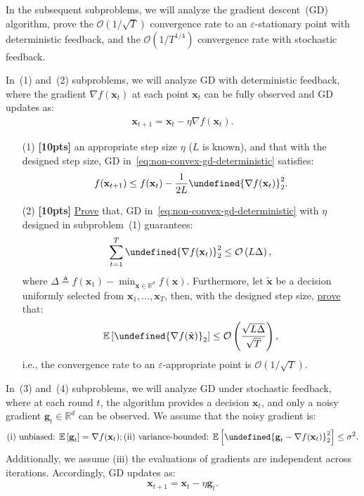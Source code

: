 \documentclass[a4paper]{article}
\numberwithin{equation}{section}
\theoremstyle{definition}
\theoremstyle{definition}
\def \E {\mathbb{E}}
\def \O {\mathcal{O}}
\def \R {\mathbb{R}}
\def \g {\textbf{g}}
\def \x {\textbf{x}}
\def \xt {\tilde{\x}}
\let\norm\undefined
\let\epsilon\varepsilon
\DeclarePairedDelimiter\norm{\lVert}{\rVert}
\begin{document}
In the subsequent subproblems, we will analyze the gradient descent~(GD) algorithm, prove the $\O(1/\sqrt{T})$ convergence rate to an $\epsilon$-stationary point with deterministic feedback, and the $\O(1/T^{1/4})$ convergence rate with stochastic feedback. 

\begin{tcolorbox}
  In~(1) and~(2) subproblems, we will analyze GD with deterministic feedback, where the gradient $\nabla f(\x_t)$ at each point $\x_t$ can be fully observed and GD updates as:
\begin{align}
  \label{eq:non-convex-gd-deterministic}
  \x_{t+1} = \x_t - \eta \nabla f(\x_t).
\end{align}
\end{tcolorbox}

\begin{enumerate}
  \item[(1)] \textbf{[10pts]}  an appropriate step size $\eta$ ($L$ is known), and  that with the designed step size, GD in~\eqref{eq:non-convex-gd-deterministic} satisfies:
  \begin{align*}
    f(\x_{t+1}) \leq f(\x_t) - \frac{1}{2L}\norm{\nabla f(\x_t)}_2^2.
  \end{align*}
  \item[(2)] \textbf{[10pts]} \underline{Prove} that, GD in~\eqref{eq:non-convex-gd-deterministic} with $\eta$ designed in subproblem~(1) guarantees:
    \begin{align*}
      \sum_{t=1}^T\norm{\nabla f(\x_t)}_2^2 \leq \O\left(L\Delta\right),
    \end{align*}
    where $\Delta \triangleq f(\x_1) - \min_{\x \in \R^d} f(\x)$. Furthermore, let $\xt$ be a decision uniformly selected from $\x_1, \dots, \x_T$, then, with the designed step size, \underline{prove} that:
    \begin{align*}
      \E\left[\norm{\nabla f(\xt)}_2\right] \leq \O\left(\frac{\sqrt{L\Delta}}{\sqrt{T}}\right),
    \end{align*}
    i.e., the convergence rate to an $\epsilon$-appropriate point is $\O(1/\sqrt{T})$.
\end{enumerate}
\begin{tcolorbox}
  In~(3) and~(4) subproblems, we will analyze GD under stochastic feedback, where at each round $t$, the algorithm provides a decision $\x_t$, and only a noisy gradient $\g_t \in \R^d$ can be observed. We assume that the noisy gradient is:
  \begin{align*}
    \text{(i) unbiased: } \E\left[\g_t\right] = \nabla f(\x_t); \text{(ii) variance-bounded: } \E\left[\norm{\g_t - \nabla f(\x_t)}_2^2\right] \leq \sigma^2.
  \end{align*}
  Additionally, we assume (iii) the evaluations of gradients are independent across iterations. Accordingly, GD updates as:
\begin{align}
  \label{eq:non-convex-gd-stochastic}
  \x_{t+1} = \x_t - \eta \g_t.
\end{align}
\end{tcolorbox}
\end{document}
